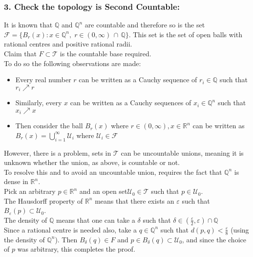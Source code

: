 \documentclass[11pt]{report}
\theoremstyle{thm}
\begin{document}
\subsubsection{3. Check the topology is Second Countable:}
It is known that $\mathbb{Q}$ and $\mathbb{Q}^n$ are countable and therefore so 
is the set $\mathcal{F}=\{B_r(x): x \in \mathbb{Q}^n,\; r\in 
(0,\infty)\,\cap\,\mathbb{Q} \}$. This set is the set of open balls with 
rational centres and positive rational radii.\\[1em]
Claim that $F\subset \mathcal{T}$ is the countable base required.\\[1em]
To do so the following observations are made:
\begin{itemize}
	\item Every real number $r$ can be written as a Cauchy sequence of $r_i\in \mathbb{Q}$ such that $r_i \nearrow r$
	\item Similarly, every $x$ can be written as a Cauchy sequences of $x_i\in \mathbb{Q}^n $ such that $x_i \nearrow x$
	\item Then consider the ball $B_r(x)$ where $r\in (0,\infty), x\in \mathbb{R}^n$ can be written as $B_r(x)=\bigcup\limits_{i=1}^{\infty}{\mathcal{U}_i}$ where $\mathcal{U}_i \in \mathcal{F}$
\end{itemize}
However, there is a problem, sets in $\mathcal{T}$ can be uncountable unions, 
meaning it is unknown whether the union, as above, is countable or not.\\[1em] 
To resolve this and to avoid an uncountable union, requires the fact that 
$\mathbb{Q}^n$ is dense in $\mathbb{R}^n$.\\[1em]
Pick an arbitrary $p\in \mathbb{R}^n$ and an open set$ \mathcal{U}_0 \in 
\mathcal{T}$ such that $p\in \mathcal{U}_0$.\\[1em]
The Hausdorff property of $\mathbb{R}^n$ means that there exists an $\varepsilon$ such that $B_\varepsilon(p) \subset \mathcal{U}_0$.\\[1em]
The density of $\mathbb{Q}$ means that one can take a $\delta$ such that $\delta \in  (\frac{\varepsilon}{2},\varepsilon) \cap \mathbb{Q}$\\[1em]
Since a rational centre is needed also, take a $q \in \mathbb{Q}^n$ such that $d(p,q)<\displaystyle\frac{\varepsilon}{8}$ (using the density of $\mathbb{Q}^n$).
Then $B_\delta(q) \in F$ and $p\in B_\delta(q)\subset \mathcal{U}_0$, and since 
the choice of $p$ was arbitrary, this completes the proof.
\end{document}

